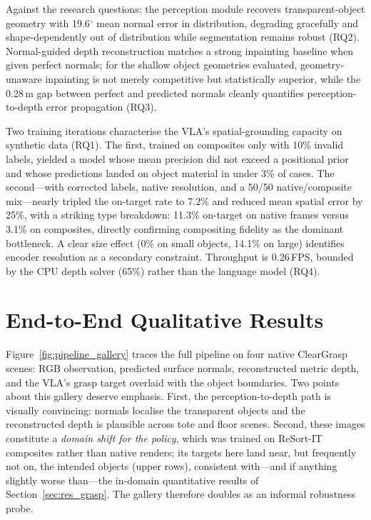 Against the research questions: the perception module recovers
transparent-object geometry with 19.6$^{\circ}$ mean normal error in
distribution, degrading gracefully and shape-dependently out of distribution
while segmentation remains robust (RQ2). Normal-guided depth reconstruction
matches a strong inpainting baseline when given perfect normals; for the
shallow object geometries evaluated, geometry-unaware inpainting is not
merely competitive but statistically superior, while the 0.28\,m gap between
perfect and predicted normals cleanly quantifies perception-to-depth error
propagation (RQ3).
 
Two training iterations characterise the VLA's spatial-grounding capacity on
synthetic data (RQ1). The first, trained on composites only with 10\% invalid
labels, yielded a model whose mean precision did not exceed a positional
prior and whose predictions landed on object material in under 3\% of cases.
The second---with corrected labels, native resolution, and a 50/50
native/composite mix---nearly tripled the on-target rate to 7.2\% and
reduced mean spatial error by 25\%, with a striking type breakdown: 11.3\%
on-target on native frames versus 3.1\% on composites, directly confirming
compositing fidelity as the dominant bottleneck. A clear size effect (0\% on
small objects, 14.1\% on large) identifies encoder resolution as a secondary
constraint. Throughput is 0.26\,FPS, bounded by the CPU depth solver (65\%)
rather than the language model (RQ4).
 
\section{End-to-End Qualitative Results}
\label{sec:res_e2e}

Figure~\ref{fig:pipeline_gallery} traces the full pipeline on four native ClearGrasp scenes: RGB observation, predicted surface normals, reconstructed metric depth, and the VLA's grasp target overlaid with the object boundaries. Two points about this gallery deserve emphasis. First, the perception-to-depth path is visually convincing: normals localise the transparent objects and the reconstructed depth is plausible across tote and floor scenes. Second, these images constitute a \emph{domain shift for the policy}, which was trained on ReSort-IT composites rather than native renders; its targets here land near, but frequently not on, the intended objects (upper rows), consistent with---and if anything slightly worse than---the in-domain quantitative results of Section~\ref{sec:res_grasp}. The gallery therefore doubles as an informal robustness probe.

